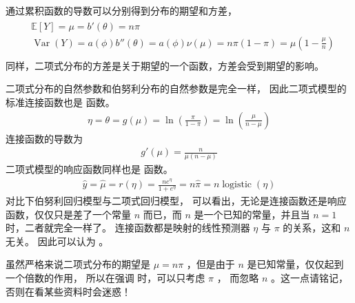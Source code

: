 \documentclass[letterpaper,10pt,english]{sphinxmanual}
\begin{document}
通过累积函数的导数可以分别得到分布的期望和方差，
\begin{align}\label{equation:二项模型/content:二项模型/content:28}\!\begin{aligned}
&\mathbb{E}[Y] =  \mu=b'(\theta) = n \pi\\
&\mathop{Var}(Y) =a(\phi)b''(\theta)  = a(\phi)\nu(\mu) = n \pi(1-\pi) =  \mu(1-\frac{\mu}{n})\\
\end{aligned}\end{align}
同样，二项式分布的方差是关于期望的一个函数，方差会受到期望的影响。

二项式分布的自然参数和伯努利分布的自然参数是完全一样，
因此二项式模型的标准连接函数也是 
函数。
\begin{equation}\label{equation:二项模型/content:二项模型/content:29}
\begin{split}\eta=\theta = g(\mu) = \ln \left ( \frac{\pi}{1-\pi} \right ) = \ln \left ( \frac{\mu}{n-\mu} \right )\end{split}
\end{equation}
连接函数的导数为
\begin{equation}\label{equation:二项模型/content:二项模型/content:30}
\begin{split}g'(\mu) = \frac{n}{\mu(n-\mu)}\end{split}
\end{equation}
二项式模型的响应函数同样也是  函数。
\begin{equation}\label{equation:二项模型/content:二项模型/content:31}
\begin{split}\hat{y} = \hat{\mu} = r(\eta) = \frac{n e^{\eta}}{1+e^{\eta}} = n \hat{\pi}
= n \mathop{logistic}(\eta)\end{split}
\end{equation}
对比下伯努利回归模型与二项式回归模型，
可以看出，无论是连接函数还是响应函数，仅仅只是差了一个常量 \(n\)
而已，而 \(n\) 是一个已知的常量，并且当 \(n=1\) 时，二者就完全一样了。
连接函数都是映射的线性预测器 \(\eta\) 与 \(\pi\) 的关系，这和 \(n\) 无关。
因此可以认为 
。

虽然严格来说二项式分布的期望是 \(\mu=n\pi\)
，但是由于 \(n\) 是已知常量，仅仅起到一个倍数的作用，
所以在强调  时，可以只考虑 \(\pi\) ，
而忽略 \(n\) 。这一点请铭记，否则在看某些资料时会迷惑！
\end{document}
